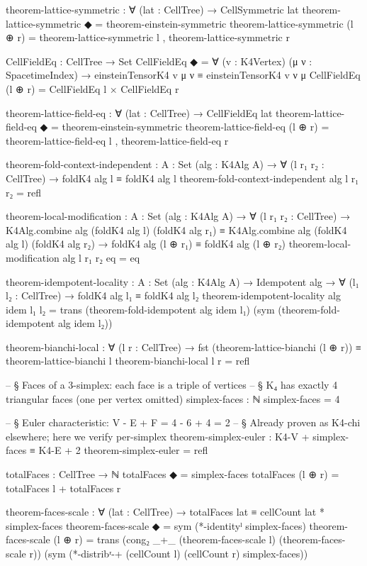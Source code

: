 \documentclass[11pt,a4paper]{book}
\begin{document}
\begin{code}
theorem-lattice-symmetric : ∀ (lat : CellTree) → CellSymmetric lat
theorem-lattice-symmetric ◆       = theorem-einstein-symmetric
theorem-lattice-symmetric (l ⊕ r) =
  theorem-lattice-symmetric l , theorem-lattice-symmetric r

CellFieldEq : CellTree → Set
CellFieldEq ◆       = ∀ (v : K4Vertex) (μ ν : SpacetimeIndex) →
                       einsteinTensorK4 v μ ν ≡ einsteinTensorK4 v ν μ
CellFieldEq (l ⊕ r) = CellFieldEq l × CellFieldEq r

theorem-lattice-field-eq : ∀ (lat : CellTree) → CellFieldEq lat
theorem-lattice-field-eq ◆       = theorem-einstein-symmetric
theorem-lattice-field-eq (l ⊕ r) =
  theorem-lattice-field-eq l , theorem-lattice-field-eq r

theorem-fold-context-independent : {A : Set} (alg : K4Alg A) →
  ∀ (l r₁ r₂ : CellTree) →
  foldK4 alg l ≡ foldK4 alg l
theorem-fold-context-independent alg l r₁ r₂ = refl

theorem-local-modification : {A : Set} (alg : K4Alg A) →
  ∀ (l r₁ r₂ : CellTree) →
  K4Alg.combine alg (foldK4 alg l) (foldK4 alg r₁)
  ≡ K4Alg.combine alg (foldK4 alg l) (foldK4 alg r₂) →
  foldK4 alg (l ⊕ r₁) ≡ foldK4 alg (l ⊕ r₂)
theorem-local-modification alg l r₁ r₂ eq = eq

theorem-idempotent-locality : {A : Set} (alg : K4Alg A) →
  Idempotent alg →
  ∀ (l₁ l₂ : CellTree) →
  foldK4 alg l₁ ≡ foldK4 alg l₂
theorem-idempotent-locality alg idem l₁ l₂ =
  trans (theorem-fold-idempotent alg idem l₁)
        (sym (theorem-fold-idempotent alg idem l₂))

theorem-bianchi-local : ∀ (l r : CellTree) →
  fst (theorem-lattice-bianchi (l ⊕ r)) ≡ theorem-lattice-bianchi l
theorem-bianchi-local l r = refl

-- § Faces of a 3-simplex: each face is a triple of vertices
-- § K₄ has exactly 4 triangular faces (one per vertex omitted)
simplex-faces : ℕ
simplex-faces = 4

-- § Euler characteristic: V - E + F = 4 - 6 + 4 = 2
-- § Already proven as K4-chi elsewhere; here we verify per-simplex
theorem-simplex-euler : K4-V + simplex-faces ≡ K4-E + 2
theorem-simplex-euler = refl

totalFaces : CellTree → ℕ
totalFaces ◆       = simplex-faces
totalFaces (l ⊕ r) = totalFaces l + totalFaces r

theorem-faces-scale : ∀ (lat : CellTree) →
  totalFaces lat ≡ cellCount lat * simplex-faces
theorem-faces-scale ◆ = sym (*-identityˡ simplex-faces)
theorem-faces-scale (l ⊕ r) =
  trans (cong₂ _+_
               (theorem-faces-scale l)
               (theorem-faces-scale r))
        (sym (*-distribʳ-+ (cellCount l) (cellCount r) simplex-faces))


\end{code}
\end{document}
